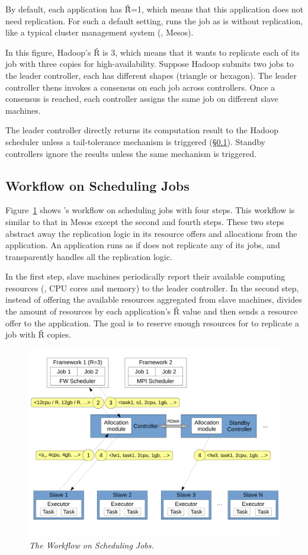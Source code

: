 By default, each application has \v{\v{R}=1}, which means that this application 
does not need replication. For such a default setting, \xxx runs the job as is 
without replication, like a typical cluster management system (\eg, Mesos).

In this figure, Hadoop's \v{R} is 3, which means that it wants to replicate 
each of its job with three copies for high-availability. Suppose Hadoop 
submits two jobs to the leader controller, each has different shapes (triangle 
or hexagon). The leader controller thens invokes a consensus on each job across 
controllers. Once a consensus is reached, each controller assigns the same job 
on different slave machines.

The leader controller directly returns its computation result to the Hadoop 
scheduler unless a tail-tolerance mechanism is triggered (\S\ref{sec:workflow}). 
Standby controllers ignore the results unless the same mechanism is triggered.



\subsection{Workflow on Scheduling Jobs} \label{sec:workflow}

Figure~\ref{fig:workflow} shows \xxx's workflow on scheduling jobs with four 
steps. This workflow is similar to that in Mesos except the second and fourth 
steps. These two steps \xxx abstract away the replication logic in its resource 
offers and allocations from the application. An application runs as if \xxx does 
not replicate any of its jobs, and \xxx transparently handles all the 
replication logic.

In the first step, slave machines periodically report their available computing 
resources (\eg, CPU cores and memory) to the leader controller. In the second 
step, instead of offering the available resources aggregated from slave 
machines, \xxx divides the amount of resources by each application's \v{R} 
value and then sends a resource offer to the application. The goal is to 
reserve enough resources for \xxx to replicate a job with \v{R} copies.

\begin{figure}[t]
\centering
\includegraphics[width=.47\textwidth]{figures/flow}
\vspace{-.2in}
\caption{{\em The \xxx Workflow on Scheduling Jobs.}} \label{fig:workflow}
\vspace{.05in}
\end{figure}

